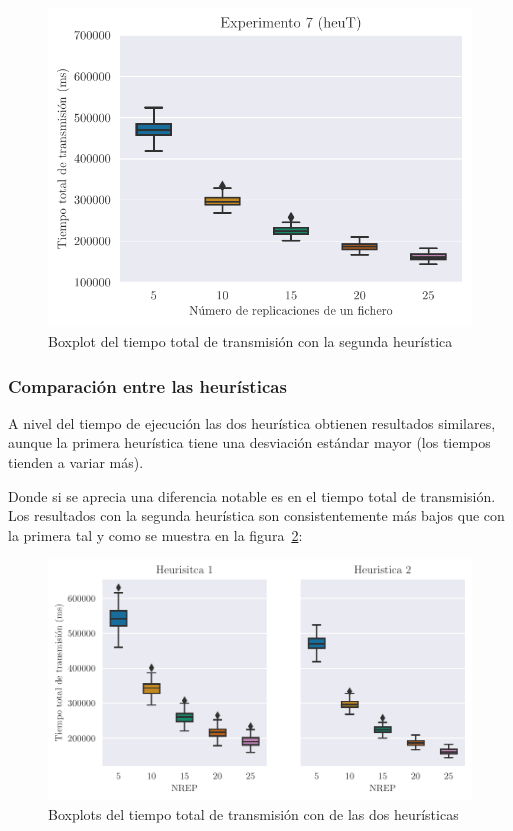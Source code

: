 \begin{figure}[H]
    \centering
    \includegraphics{include/plots/ex7_ttt_bplot_n.pdf}
    \caption{Boxplot del tiempo total de transmisión con la segunda heurística}%
    \label{fig:ex7ttt_total}
\end{figure}

\subsubsection{Comparación entre las heurísticas}

A nivel del tiempo de ejecución las dos heurística obtienen resultados similares, aunque la primera
heurística tiene una desviación estándar mayor (los tiempos tienden a variar más).

Donde si se aprecia una diferencia notable es en el tiempo total de transmisión. Los resultados
con la segunda heurística son consistentemente más bajos que con la primera tal y como se muestra en
la figura~\ref{fig:ex7comp}:

\begin{figure}[H]
    \centering
    \includegraphics{include/plots/ex7_comp.pdf}
    \caption{Boxplots del tiempo total de transmisión con de las dos heurísticas}%
    \label{fig:ex7comp}
\end{figure}


